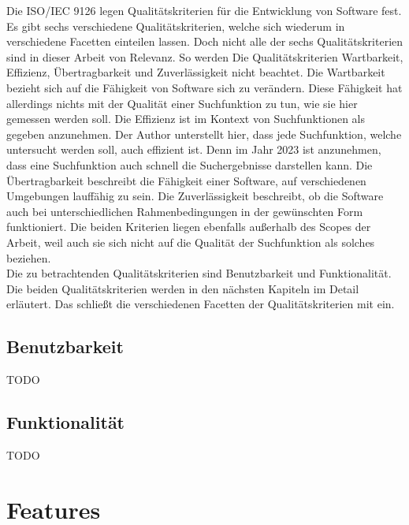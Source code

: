 Die ISO/IEC 9126 legen Qualitätskriterien für die Entwicklung von Software fest.
Es gibt sechs verschiedene Qualitätskriterien, welche sich wiederum in verschiedene Facetten einteilen lassen.
Doch nicht alle der sechs Qualitätskriterien sind in dieser Arbeit von Relevanz.
So werden Die Qualitätskriterien Wartbarkeit, Effizienz, Übertragbarkeit und Zuverlässigkeit nicht beachtet.
Die Wartbarkeit bezieht sich auf die Fähigkeit von Software sich zu verändern.
Diese Fähigkeit hat allerdings nichts mit der Qualität einer Suchfunktion zu tun, wie sie hier gemessen werden soll.
Die Effizienz ist im Kontext von Suchfunktionen als gegeben anzunehmen.
Der Author unterstellt hier, dass jede Suchfunktion, welche untersucht werden soll, auch effizient ist.
Denn im Jahr 2023 ist anzunehmen, dass eine Suchfunktion auch schnell die Suchergebnisse darstellen kann.
Die Übertragbarkeit beschreibt die Fähigkeit einer Software, auf verschiedenen Umgebungen lauffähig zu sein.
Die Zuverlässigkeit beschreibt, ob die Software auch bei unterschiedlichen Rahmenbedingungen in der gewünschten Form funktioniert.
Die beiden Kriterien liegen ebenfalls außerhalb des Scopes der Arbeit, weil auch sie sich nicht auf die Qualität der Suchfunktion als solches beziehen.\\

Die zu betrachtenden Qualitätskriterien sind Benutzbarkeit und Funktionalität.
Die beiden Qualitätskriterien werden in den nächsten Kapiteln im Detail erläutert.
Das schließt die verschiedenen Facetten der Qualitätskriterien mit ein.

\subsection{Benutzbarkeit}

TODO

\subsection{Funktionalität}

TODO

\section{Features}

